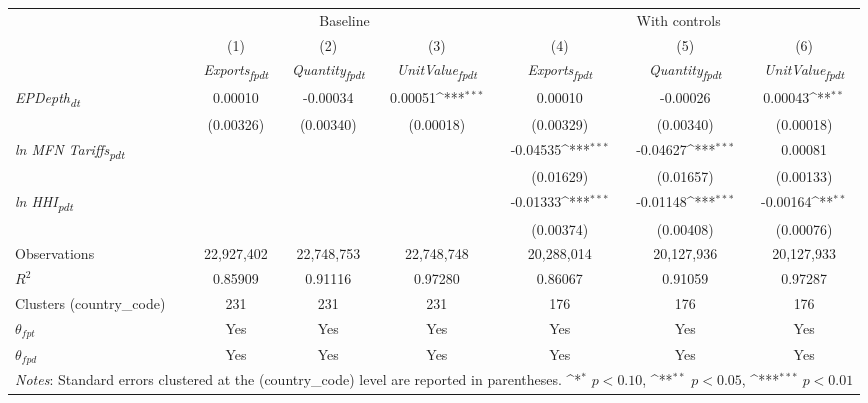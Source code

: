 {
\def\sym#1{\ifmmode^{#1}\else\(^{#1}\)\fi}
\begin{tabular}{l*{6}{c}}
\toprule
&\multicolumn{3}{c}{Baseline}&\multicolumn{3}{c}{With controls}\\\cmidrule(lr){2-4}\cmidrule(lr){5-7}
&(1)&(2)&(3)&(4)&(5)&(6)\\
&\textit{Exports\textsubscript{fpdt}}&\textit{Quantity\textsubscript{fpdt}}&\textit{UnitValue\textsubscript{fpdt}}&\textit{Exports\textsubscript{fpdt}}&\textit{Quantity\textsubscript{fpdt}}&\textit{UnitValue\textsubscript{fpdt}}\\
\midrule
\textit{EPDepth\textsubscript{dt}} & 0.00010 & -0.00034 & 0.00051\sym{***} & 0.00010 & -0.00026 & 0.00043\sym{**}\\
 & (0.00326) & (0.00340) & (0.00018) & (0.00329) & (0.00340) & (0.00018)\\
\addlinespace
\textit{ln MFN Tariffs\textsubscript{pdt}} &  &  &  & -0.04535\sym{***} & -0.04627\sym{***} & 0.00081\\
 &  &  &  & (0.01629) & (0.01657) & (0.00133)\\
\addlinespace
\textit{ln HHI\textsubscript{pdt}} &  &  &  & -0.01333\sym{***} & -0.01148\sym{***} & -0.00164\sym{**}\\
 &  &  &  & (0.00374) & (0.00408) & (0.00076)\\
\midrule
Observations & 22,927,402 & 22,748,753 & 22,748,748 & 20,288,014 & 20,127,936 & 20,127,933\\
$R^{2}$ & 0.85909 & 0.91116 & 0.97280 & 0.86067 & 0.91059 & 0.97287\\
Clusters (country_code) & 231 & 231 & 231 & 176 & 176 & 176\\
$\theta_{fpt}$ & Yes & Yes & Yes & Yes & Yes & Yes\\
$\theta_{fpd}$ & Yes & Yes & Yes & Yes & Yes & Yes\\
\bottomrule
\multicolumn{7}{l}{\footnotesize \textit{Notes}: Standard errors clustered at the (country_code) level are reported in parentheses. \sym{*} \(p<0.10\), \sym{**} \(p<0.05\), \sym{***} \(p<0.01\)}\\
\end{tabular}
}

